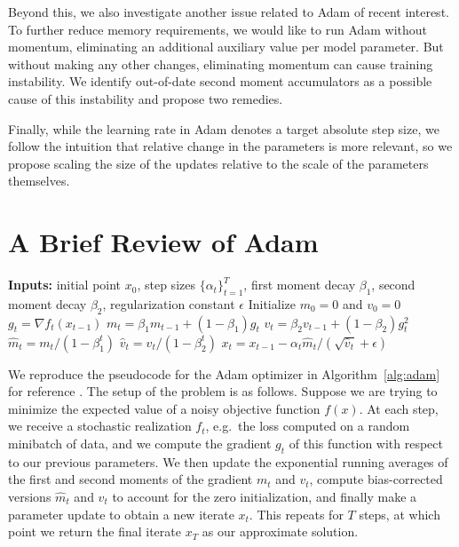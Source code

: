 \documentclass{article}
\begin{document}

Beyond this, we also investigate another issue related to Adam of recent interest. To further reduce memory requirements, we would like to run Adam without momentum, eliminating an additional auxiliary value per model parameter.  But without making any other changes, eliminating momentum can cause training instability.  We identify out-of-date second moment accumulators as a possible cause of this instability and propose two remedies.

Finally, while the learning rate in Adam denotes a target absolute step size, we follow the intuition that relative change in the parameters is more relevant, so we propose scaling the size of the updates relative to the scale of the parameters themselves.



\section{A Brief Review of Adam}

\begin{algorithm}
\begin{algorithmic}[1]
\STATE \textbf{Inputs:} initial point $x_0$, step sizes $\{\alpha_t\}_{t=1}^T$, first moment decay $\beta_1$, second moment decay $\beta_2$, regularization constant $\epsilon$
\STATE Initialize $m_0 = 0$ and $v_0 = 0$
  \STATE $g_t = \nabla f_t(x_{t-1})$
  \STATE $m_t = \beta_1 m_{t-1} + (1 - \beta_1) g_t$
  \STATE $v_t = \beta_2 v_{t-1} + (1 - \beta_2) g_t^2$
  \STATE $\hat{m}_t = m_t / (1 - \beta_1^t)$
  \STATE $\hat{v}_t = v_t / (1 - \beta_2^t)$
  \STATE $x_t = x_{t-1} - \alpha_t \hat{m}_t / (\sqrt{\hat{v}_t} + \epsilon)$
\ENDFOR
\end{algorithmic}
\caption{Adam \cite{Kingma14Adam}}
\label{alg:adam}
\end{algorithm}

We reproduce the pseudocode for the Adam optimizer in Algorithm~\ref{alg:adam} for reference \cite{Kingma14Adam}. The setup of the problem is as follows. Suppose we are trying to minimize the expected value of a noisy objective function $f(x)$. At each step, we receive a stochastic realization $f_t$, e.g.\ the loss computed on a random minibatch of data, and we compute the gradient $g_t$ of this function with respect to our previous parameters. We then update the exponential running averages of the first and second moments of the gradient $m_t$ and $v_t$, compute bias-corrected versions $\hat{m}_t$ and $\hat{v}_t$ to account for the zero initialization, and finally make a parameter update to obtain a new iterate $x_t$. This repeats for $T$ steps, at which point we return the final iterate $x_T$ as our approximate solution.
\end{document}
